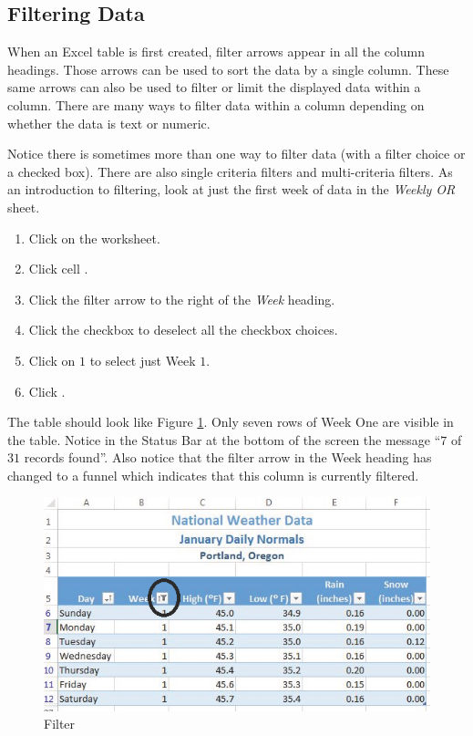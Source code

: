 \subsection{Filtering Data}

When an Excel table is first created, filter arrows appear in all the column headings. Those arrows can be used to sort the data by a single column. These same arrows can also be used to filter or limit the displayed data within a column. There are many ways to filter data within a column depending on whether the data is text or numeric. 

Notice there is sometimes more than one way to filter data (\ie with a filter choice or a checked box). There are also single criteria filters and multi-criteria filters. As an introduction to filtering, look at just the first week of data in the \textit{Weekly OR} sheet.

\begin{enumerate}
	\item Click on the  worksheet.
	\item Click cell .
	\item Click the filter arrow to the right of the \textit{Week} heading.
	\item Click the  checkbox to deselect all the checkbox choices.
	\item Click on $ 1 $ to select just Week $ 1 $.
	\item Click .
\end{enumerate}

The table should look like Figure \ref{05:fig16}. Only seven rows of Week One are visible in the table. Notice in the Status Bar at the bottom of the screen the message ``$ 7 $ of $ 31 $ records found''. Also notice that the filter arrow in the Week heading has changed to a funnel which indicates that this column is currently filtered.

\begin{figure}[H]
	\centering
	\includegraphics[width=\maxwidth{.95\linewidth}]{gfx/ch05_fig16}
	\caption{Filter}
	\label{05:fig16}
\end{figure}

